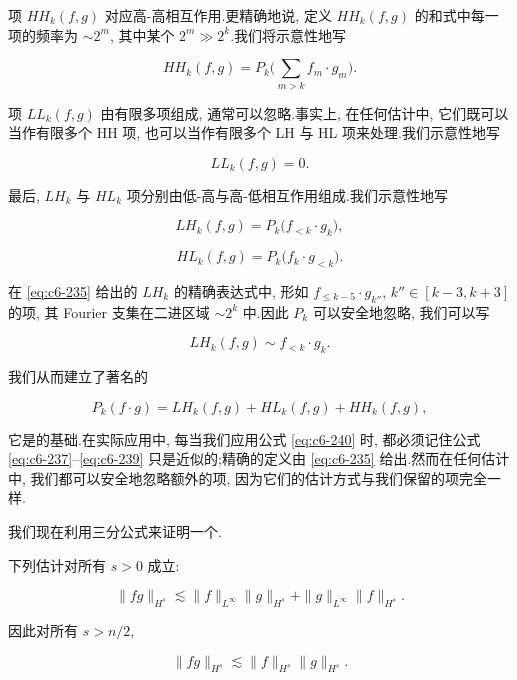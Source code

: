项 $HH_k(f, g)$ 对应高-高相互作用.更精确地说, 定义 $HH_k(f, g)$ 的和式中每一项的频率为 $\sim 2^m$, 其中某个 $2^m \gg 2^k$.我们将示意性地写

\begin{equation}
HH_k(f, g) = P_k\big(\sum_{m > k} f_m \cdot g_m\big).\label{eq:c6-236}
\end{equation}

项 $LL_k(f, g)$ 由有限多项组成, 通常可以忽略.事实上, 在任何估计中, 它们既可以当作有限多个 HH 项, 也可以当作有限多个 LH 与 HL 项来处理.我们示意性地写

\begin{equation}
LL_k(f, g) = 0.\label{eq:c6-237}
\end{equation}

最后, $LH_k$ 与 $HL_k$ 项分别由低-高与高-低相互作用组成.我们示意性地写

\begin{equation}
LH_k(f, g) = P_k\big(f_{< k} \cdot g_k\big), \label{eq:c6-238}
\end{equation}

\begin{equation}
HL_k(f, g) = P_k\big(f_k \cdot g_{< k}\big).\label{eq:c6-239}
\end{equation}

\begin{remark*}
在 \eqref{eq:c6-235} 给出的 $LH_k$ 的精确表达式中, 形如 $f_{\leq k-5} \cdot g_{k''}$, $k'' \in [k-3, k+3]$ 的项, 其 Fourier 支集在二进区域 $\sim 2^k$ 中.因此 $P_k$ 可以安全地忽略, 我们可以写

\[
LH_k(f, g) \sim f_{< k} \cdot g_k.
\]

我们从而建立了著名的

\begin{equation}
P_k(f \cdot g) = LH_k(f, g) + HL_k(f, g) + HH_k(f, g), \label{eq:c6-240}
\end{equation}

它是的基础.在实际应用中, 每当我们应用公式 \eqref{eq:c6-240} 时, 都必须记住公式 \eqref{eq:c6-237}--\eqref{eq:c6-239} 只是近似的;精确的定义由 \eqref{eq:c6-235} 给出.然而在任何估计中, 我们都可以安全地忽略额外的项, 因为它们的估计方式与我们保留的项完全一样.
\end{remark*}

我们现在利用三分公式来证明一个.

\begin{theorem}\label{thm:c6-3.7}
下列估计对所有 $s > 0$ 成立:

\begin{equation}
\|fg\|_{H^s} \lesssim \|f\|_{L^\infty} \|g\|_{H^s} + \|g\|_{L^\infty} \|f\|_{H^s}.\label{eq:c6-241}
\end{equation}

因此对所有 $s > n/2$,

\begin{equation}
\|fg\|_{H^s} \lesssim \|f\|_{H^s} \|g\|_{H^s}.\label{eq:c6-242}
\end{equation}
\end{theorem}

